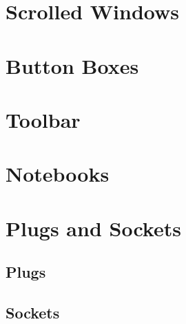\section{Scrolled Windows}
\section{Button Boxes}
\section{Toolbar}
\section{Notebooks}
\section{Plugs and Sockets}
\subsection{Plugs}
\subsection{Sockets}
